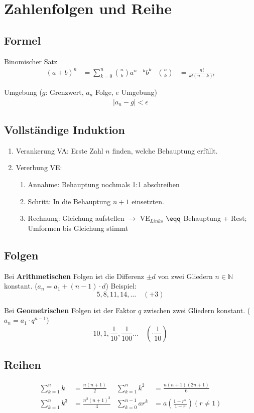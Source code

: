 
\section{Zahlenfolgen und Reihe}

\subsection{Formel}
\noindent Binomischer Satz
\begin{align*}
	(a+b)^n &= \sum_{k=0}^n \binom{n}{k} a^{n-k} b^k
	&
	\binom{n}{k} &= \frac{n!}{k!(n-k)!}
\end{align*}

\noindent Umgebung ($g$: Grenzwert, $a_n$ Folge, $e$ Umgebung)
\begin{align*}
	\left|a_n - g\right| < \epsilon
\end{align*}

\subsection{Vollständige Induktion}\label{induktion}
\begin{enumerate}[nosep]
	\item Verankerung VA: Erste Zahl $n$ finden, welche Behauptung erfüllt.
	\item Vererbung VE:
	\begin{enumerate}
		\item Annahme: Behauptung nochmals 1:1 abschreiben
		\item Schritt: In die Behauptung $n+1$ einsetzten.
		\item Rechnung: Gleichung aufstellen $\rightarrow$ VE$_{Links}$ $\eqq$ Behauptung + Rest; Umformen bis Gleichung stimmt
	\end{enumerate}

\end{enumerate}

\subsection{Folgen}
\noindent Bei \textbf{Arithmetischen} Folgen ist die Differenz $\pm d$ von zwei Gliedern $n \in \mathbb{N}$ konstant. ($a_n = a_1 + (n - 1) \cdot d$) Beispiel:
\[5,8,11,14,\dots \quad (+3)\]

\noindent Bei \textbf{Geometrischen} Folgen ist der Faktor $q$ zwischen zwei Gliedern konstant. ($a_n = a_1 \cdot q^{n-1}$)
\[10, 1, \frac{1}{10}, \frac{1}{100}\dots \quad (\cdot \frac{1}{10})\]


\subsection{Reihen}
\begin{align*}
	\sum_{k=1}^n k   &= \frac{n(n+1)}{2} &
	\sum_{k=1}^n k^2 &= \frac{n(n+1)(2n+1)}{6} \\
	\sum_{k=1}^n k^3 &= \frac{n^2(n+1)^2}{4} &
	\sum_{k=0}^{n-1} ar^k &= a\left(\frac{1-r^n}{1-r}\right) (r \neq 1)
\end{align*}
